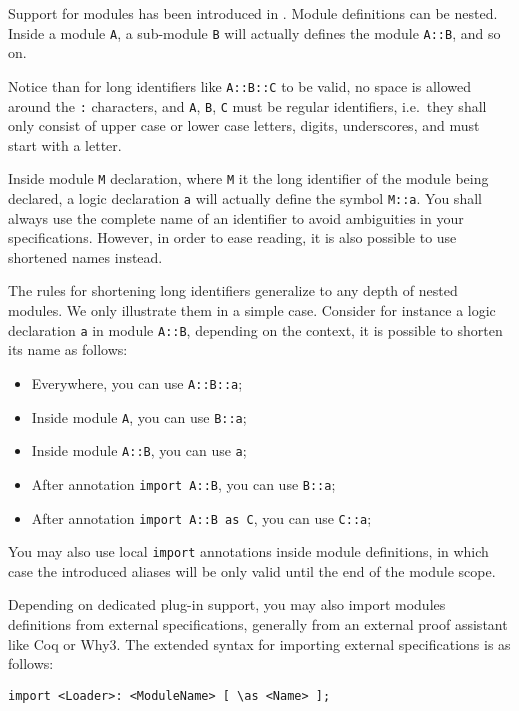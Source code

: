 Support for \acsl modules has been introduced in \nextframacversion.
Module definitions can be nested. Inside a module \verb+A+,
a sub-module \verb+B+ will actually defines the module \verb+A::B+, and so on.

Notice than for long identifiers like \verb+A::B::C+ to be valid, no space is
allowed around the \verb+:+ characters, and \verb+A+, \verb+B+, \verb+C+ must be
regular \acsl identifiers, i.e.~they shall only consist of upper case or lower
case letters, digits, underscores, and must start with a letter.

Inside module \verb+M+ declaration, where \verb+M+ it the long identifier of the
module being declared, a logic declaration \verb+a+ will actually define the
symbol \verb+M::a+. You shall always use the complete name of an identifier to
avoid ambiguities in your specifications. However, in order to ease reading, it
is also possible to use shortened names instead.

The rules for shortening long identifiers generalize to any depth of nested
modules. We only illustrate them in a simple case. Consider for instance a logic
declaration \verb+a+ in module \verb+A::B+, depending on the context, it is
possible to shorten its name as follows:
\begin{itemize}
\item Everywhere, you can use \verb+A::B::a+;
\item Inside module \verb+A+, you can use \verb+B::a+;
\item Inside module \verb+A::B+, you can use \verb+a+;
\item After annotation \lstinline[language=ACSL]|import A::B|, you can use
  \verb+B::a+;
\item After annotation \lstinline[language=ACSL]|import A::B as C|, you can use
  \verb+C::a+;
\end{itemize}

You may also use local \lstinline[language=ACSL]+import+ annotations inside
module definitions, in which case the introduced aliases will be only valid
until the end of the module scope.

Depending on dedicated plug-in support, you may also import modules definitions
from external specifications, generally from an external proof assistant like
\textsf{Coq} or \textsf{Why3}. The \acsl extended syntax for importing external
specifications is as follows:

\begin{lstlisting}[language=ACSL]
import <Loader>: <ModuleName> [ \as <Name> ];
\end{lstlisting}

